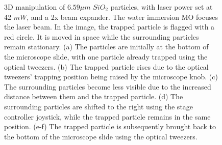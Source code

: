 \documentclass[letterpaper,12pt,oneside]{book}
\begin{document}
\begin{figure}[H]
\begin{subfigure}[b]{0.3\textwidth}
         \caption{}
         \label{fig:five over x}
     \end{subfigure}
     \caption{3D manipulation of $6.59 \mu m$ $SiO_2$ particles, with laser power set at 42 $mW$, and a 2x beam expander. The water immersion MO focuses the laser beam. In the image, the trapped particle is flagged with a red circle. It is moved in space while the surrounding particles remain stationary. (a) The particles are initially at the bottom of the microscope slide, with one particle already trapped using the optical tweezers. (b) The trapped particle rises due to the optical tweezers' trapping position being raised by the microscope knob. (c) The surrounding particles become less visible due to the increased distance between them and the trapped particle. (d) The surrounding particles are shifted to the right using the stage controller joystick, while the trapped particle remains in the same position. (e-f) The trapped particle is subsequently brought back to the bottom of the microscope slide using the optical tweezers. }
    \label{fig3d}
\end{figure}
\end{document}
